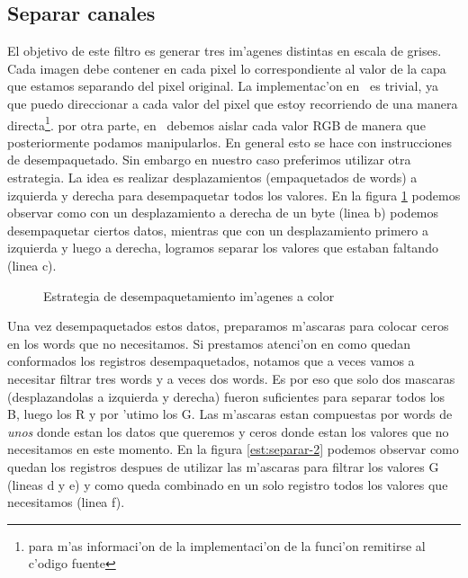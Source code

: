 \subsection{Separar canales}
El objetivo de este filtro es generar tres im'agenes distintas en escala de grises. Cada imagen debe contener en cada pixel lo correspondiente al valor de la capa que estamos separando del pixel original. La implementac'on en \C\ es trivial, ya que puedo direccionar a cada valor del pixel que estoy recorriendo de una manera directa\footnote{para m'as informaci'on de la implementaci'on de la funci'on remitirse al c'odigo fuente}. por otra parte, en \ass\ debemos aislar cada valor RGB de manera que posteriormente podamos manipularlos. En general esto se hace con instrucciones de desempaquetado. Sin embargo en nuestro caso preferimos utilizar otra estrategia. La idea es realizar desplazamientos (empaquetados de words) a izquierda y derecha para desempaquetar todos los valores. En la figura \ref{est:separar-1} podemos observar como con un desplazamiento a derecha de un byte (linea b) podemos desempaquetar ciertos datos, mientras que con un desplazamiento primero a izquierda y luego a derecha, logramos separar los valores que estaban faltando (linea c).

\begin{figure}[ht]
\caption{Estrategia de desempaquetamiento im'agenes a color}
\label{est:separar-1}
\end{figure}

Una vez desempaquetados estos datos, preparamos m'ascaras para colocar ceros en los words que no necesitamos. Si prestamos atenci'on en como quedan conformados los registros desempaquetados, notamos que a veces vamos a necesitar filtrar tres words y a veces dos words. Es por eso que solo dos mascaras (desplazandolas a izquierda y derecha) fueron suficientes para separar todos los B, luego los R y por 'utimo los G. Las m'ascaras estan compuestas por words de \textit{unos} donde estan los datos que queremos y ceros donde estan los valores que no necesitamos en este momento. En la figura \ref{est:separar-2} podemos observar como quedan los registros despues de utilizar las m'ascaras para filtrar los valores G (lineas d y e) y como queda combinado en un solo registro todos los valores que necesitamos (linea f).

